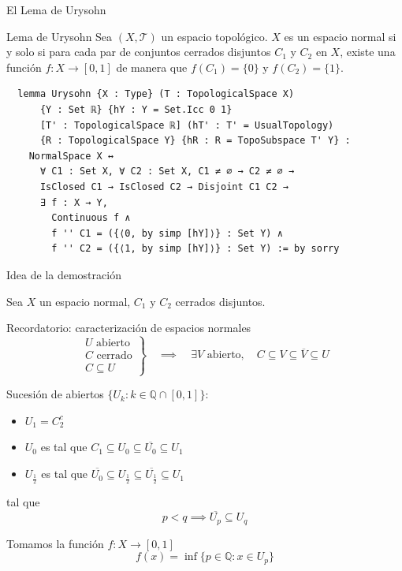 \documentclass{beamer}
\begin{document}
\begin{frame}[fragile]{El Lema de Urysohn}

  \begin{block}{Lema de Urysohn}
    Sea $(X, \mathcal{T})$ un espacio topológico. $X$ es un espacio normal si y solo si para cada par de conjuntos cerrados disjuntos $C_1$ y $C_2$ en $X$, existe una función $f : X \to [0, 1]$ de manera que $f(C_1) = \{0\}$ y $f(C_2) = \{1\}$.
  \end{block}

  \begin{lstlisting}
  lemma Urysohn {X : Type} (T : TopologicalSpace X)
      {Y : Set ℝ} {hY : Y = Set.Icc 0 1}
      [T' : TopologicalSpace ℝ] (hT' : T' = UsualTopology)
      {R : TopologicalSpace Y} {hR : R = TopoSubspace T' Y} :
    NormalSpace X ↔
      ∀ C1 : Set X, ∀ C2 : Set X, C1 ≠ ∅ → C2 ≠ ∅ →
      IsClosed C1 → IsClosed C2 → Disjoint C1 C2 →
      ∃ f : X → Y,
        Continuous f ∧
        f '' C1 = ({⟨0, by simp [hY]⟩} : Set Y) ∧
        f '' C2 = ({⟨1, by simp [hY]⟩} : Set Y) := by sorry \end{lstlisting}
  
\end{frame}

\begin{frame}{Idea de la demostración}

  Sea $X$ un espacio normal, $C_1$ y $C_2$ cerrados disjuntos.
  
  \begin{block}{Recordatorio: caracterización de espacios normales}
    $$
    \left.
    \begin{array}{l}
    U \text{ abierto} \\
    C \text{ cerrado} \\
    C \subseteq U
    \end{array}
    \right\}
    \quad \implies \quad
    \exists V \text{ abierto}, \quad C \subseteq V \subseteq \overline{V} \subseteq U
    $$
  \end{block}

  Sucesión de abiertos $\{U_k : k \in \mathbb{Q} \cap [0, 1]\}$:

  \begin{itemize}
    \item $U_1 = C_2^c$
    \item $U_0$ es tal que $C_1 \subseteq U_0 \subseteq \overline{U_0} \subseteq U_1$
    \item $U_{\frac{1}{2}}$ es tal que $\overline{U_0} \subseteq U_{\frac{1}{2}} \subseteq \overline{U_{\frac{1}{2}}} \subseteq U_1$
  \end{itemize}

  tal que
  \begin{equation}
  p < q \implies \overline{U_p} \subseteq U_q \tag{$\star$} \label{eq:star}
  \end{equation}

  Tomamos la función $f : X \to [0, 1]$
  $$
  f(x) = \inf \{p \in \mathbb{Q} : x \in U_p\}
  $$

\end{frame}
\end{document}
